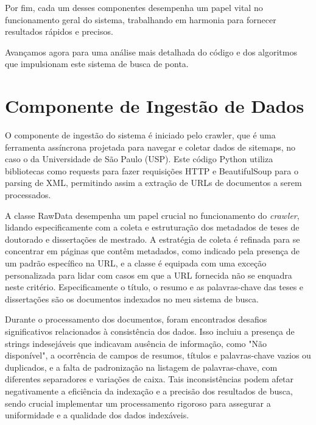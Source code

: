 \documentclass[
	12pt,				%
	openright,			%
	oneside,			%
	a4paper,			%
	english,			%
	french,				%
	spanish,			%
	brazil				%
	]{abntex2}
\begin{document}
Por fim, cada um desses componentes desempenha um papel vital no funcionamento geral do sistema, trabalhando em harmonia para fornecer resultados rápidos e precisos.

Avançamos agora para uma análise mais detalhada do código e dos algoritmos que impulsionam este sistema de busca de ponta.


\section{Componente de Ingestão de Dados}\label{sec:ingestao-de-dados}

O componente de ingestão do sistema é iniciado pelo crawler, que é uma ferramenta assíncrona projetada para navegar e coletar dados de sitemaps, no caso o da Universidade de São Paulo (USP). Este código Python utiliza bibliotecas como requests para fazer requisições HTTP e BeautifulSoup para o parsing de XML, permitindo assim a extração de URLs de documentos a serem processados.

A classe RawData desempenha um papel crucial no funcionamento do \textit{crawler}, lidando especificamente com a coleta e estruturação dos metadados de teses de doutorado e dissertações de mestrado. A estratégia de coleta é refinada para se concentrar em páginas que contêm metadados, como indicado pela presença de um padrão específico na URL, e a classe é equipada com uma exceção personalizada para lidar com casos em que a URL fornecida não se enquadra neste critério.
Especificamente o título, o resumo e as palavras-chave das teses e dissertações são os documentos indexados no meu sistema de busca.

Durante o processamento dos documentos, foram encontrados desafios significativos relacionados à consistência dos dados. Isso incluiu a presença de strings indesejáveis que indicavam ausência de informação, como "Não disponível", a ocorrência de campos de resumos, títulos e palavras-chave vazios ou duplicados, e a falta de padronização na listagem de palavras-chave, com diferentes separadores e variações de caixa. Tais inconsistências podem afetar negativamente a eficiência da indexação e a precisão dos resultados de busca, sendo crucial implementar um processamento rigoroso para assegurar a uniformidade e a qualidade dos dados indexáveis.
\end{document}
